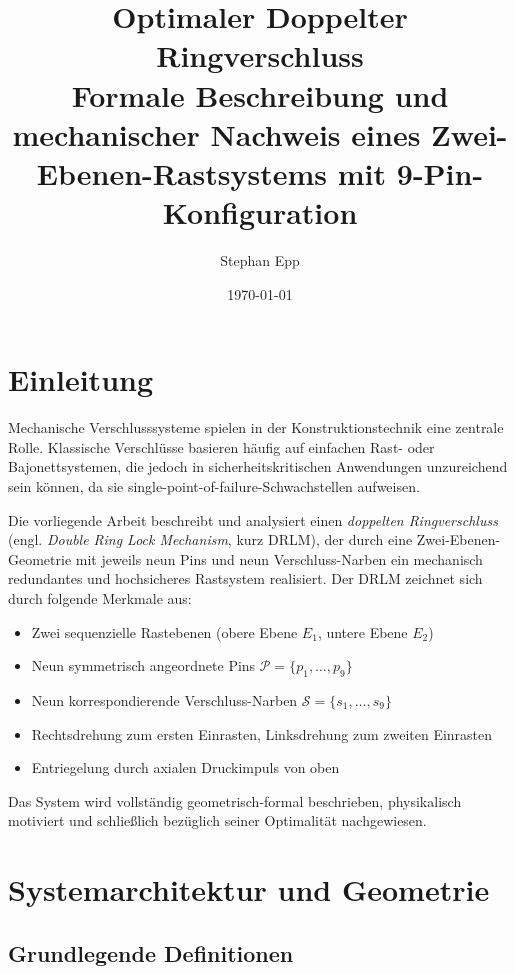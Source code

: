 ﻿\documentclass[12pt, a4paper]{article}
\title{\textbf{Optimaler Doppelter Ringverschluss}\\
\large Formale Beschreibung und mechanischer Nachweis  eines Zwei-Ebenen-Rastsystems mit 9-Pin-Konfiguration}
\author{Stephan Epp}
\date{\today}
\theoremstyle{remark}
\newcommand{\Pin}{\mathcal{P}}
\newcommand{\Scar}{\mathcal{S}}
\begin{document}
\maketitle
\tableofcontents
\newpage

\section{Einleitung}

Mechanische Verschlusssysteme spielen in der Konstruktionstechnik eine zentrale Rolle.
Klassische Verschlüsse basieren häufig auf einfachen Rast- oder Bajonettsystemen, die
jedoch in sicherheitskritischen Anwendungen unzureichend sein können, da sie
single-point-of-failure-Schwachstellen aufweisen.

Die vorliegende Arbeit beschreibt und analysiert einen \emph{doppelten Ringverschluss}
(engl. \textit{Double Ring Lock Mechanism}, kurz DRLM), der durch eine Zwei-Ebenen-Geometrie
mit jeweils neun Pins und neun Verschluss-Narben ein mechanisch redundantes und
hochsicheres Rastsystem realisiert. Der DRLM zeichnet sich durch folgende Merkmale aus:

\begin{itemize}[noitemsep]
  \item Zwei sequenzielle Rastebenen (obere Ebene $E_1$, untere Ebene $E_2$)
  \item Neun symmetrisch angeordnete Pins $\Pin = \{p_1, \ldots, p_9\}$
  \item Neun korrespondierende Verschluss-Narben $\Scar = \{s_1, \ldots, s_9\}$
  \item Rechtsdrehung zum ersten Einrasten, Linksdrehung zum zweiten Einrasten
  \item Entriegelung durch axialen Druckimpuls von oben
\end{itemize}

Das System wird vollständig geometrisch-formal beschrieben, physikalisch motiviert und
schließlich bezüglich seiner Optimalität nachgewiesen.

\section{Systemarchitektur und Geometrie}

\subsection{Grundlegende Definitionen}
\end{document}
